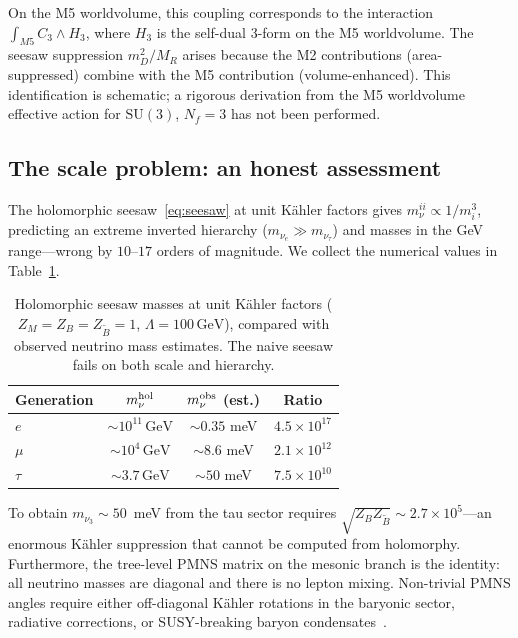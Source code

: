 \documentclass[aps,prd,twocolumn,showpacs,preprintnumbers,superscriptaddress,floatfix]{revtex4-2}
\newcommand{\SU}{\mathrm{SU}}
\newcommand{\Nf}{N_{\!f}}
\newcommand{\GeV}{\,\mathrm{GeV}}
\begin{document}
On the M5 worldvolume, this coupling corresponds to the
interaction $\int_{M5} C_3 \wedge H_3$, where $H_3$ is the
self-dual 3-form on the M5 worldvolume.
The seesaw suppression $m_D^2/M_R$ arises because the M2
contributions (area-suppressed) combine with the M5 contribution
(volume-enhanced).
This identification is schematic; a rigorous derivation from the
M5 worldvolume effective action for $\SU(3)$, $\Nf = 3$ has not
been performed.

\subsection{The scale problem: an honest assessment}

The holomorphic seesaw~\eqref{eq:seesaw} at unit K\"ahler factors
gives $m_\nu^{ii} \propto 1/m_i^3$, predicting an extreme inverted
hierarchy ($m_{\nu_e} \gg m_{\nu_\tau}$) and masses in the GeV
range---wrong by $10$--$17$ orders of magnitude.
We collect the numerical values in Table~\ref{tab:seesaw}.

\begin{table}
\centering\small
\caption{Holomorphic seesaw masses at unit K\"ahler factors
  ($Z_M = Z_B = Z_{\tilde{B}} = 1$, $\Lambda = 100\GeV$),
  compared with observed neutrino mass estimates.
  The naive seesaw fails on both scale and hierarchy.}
\label{tab:seesaw}
\begin{tabular}{lccc}
\toprule
Generation & $m_\nu^{\rm hol}$ & $m_\nu^{\rm obs}$ (est.) & Ratio \\
\midrule
$e$   & $\sim 10^{11}\GeV$ & $\sim 0.35$ meV & $4.5 \times 10^{17}$ \\
$\mu$ & $\sim 10^{4}\GeV$  & $\sim 8.6$ meV  & $2.1 \times 10^{12}$ \\
$\tau$& $\sim 3.7\GeV$     & $\sim 50$ meV   & $7.5 \times 10^{10}$ \\
\bottomrule
\end{tabular}
\end{table}

To obtain $m_{\nu_3} \sim 50$~meV from the tau sector requires
$\sqrt{Z_B Z_{\tilde{B}}} \sim 2.7 \times 10^5$---an enormous
K\"ahler suppression that cannot be computed from holomorphy.
Furthermore, the tree-level PMNS matrix on the mesonic branch is
the identity: all neutrino masses are diagonal and there is no
lepton mixing.
Non-trivial PMNS angles require either off-diagonal K\"ahler
rotations in the baryonic sector, radiative corrections, or
SUSY-breaking baryon condensates~\cite{MasieroVeneziano:1985}.
\end{document}
